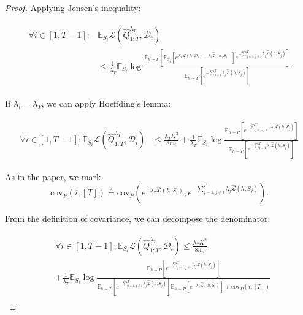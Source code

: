 \documentclass{article}
\theoremstyle{plain}
\theoremstyle{definition}
\theoremstyle{remark}
\begin{document}
\begin{proof}
Applying Jensen's inequality:

\begin{align*} 
\begin{split}
\forall i\in[1,T-1]:
&\mathbb{E}_{S_i}\mathcal{L}(\hat{Q}^{\lambda_T}_{1:T}, \mathcal{D}_i) \\&\leq \frac{1}{\lambda_T}\mathbb{E}_{S_i}\log\frac{\mathbb{E}_{h\sim P}\left [\mathbb{E}_{S_i}\left [e^{\lambda_T\mathcal{L}(h,\mathcal{D}_i)-\lambda_i\hat{\mathcal{L}}(h,S_i)} \right ]e^{-\sum_{j=1,j\neq i}^{T}\lambda_j\hat{\mathcal{L}}(h,S_j)} \right ]}{\mathbb{E}_{h\sim P}\left [e^{-\sum_{j=1}^{T}\lambda_j\hat{\mathcal{L}}(h,S_j)} \right ]}
\end{split}
\end{align*}

If $\lambda_i=\lambda_T$, we can apply Hoeffding's lemma:

\begin{align*} 
\begin{split}
\forall i\in[1,T-1]:
\mathbb{E}_{S_i}\mathcal{L}(\hat{Q}^{\lambda_T}_{1:T}, \mathcal{D}_i) &\leq \frac{\lambda_T K^2}{8m_i}+\frac{1}{\lambda_T}\mathbb{E}_{S_i}\log\frac{\mathbb{E}_{h\sim P}\left [e^{-\sum_{j=1,j\neq i}^{T}\lambda_j\hat{\mathcal{L}}(h,S_j)} \right ]}{\mathbb{E}_{h\sim P}\left [e^{-\sum_{j=1}^{T}\lambda_j\hat{\mathcal{L}}(h,S_j)} \right ]}
\end{split}
\end{align*}

As in the paper, we mark 
$$\mathrm{cov}_{P}(i, [T])\triangleq\mathrm{cov}_{P}(e^{-\lambda_T\hat{\mathcal{L}}(h,S_i)}, e^{-\sum_{j=1,j\neq i}^{T}\lambda_j\hat{\mathcal{L}}(h,S_j)}).$$

From the definition of covariance, we can decompose the denominator:

\begin{align} \label{eq-oracle-forget-extend}
\begin{split}
&\forall i\in[1,T-1]:
\mathbb{E}_{S_i}\mathcal{L}(\hat{Q}^{\lambda_T}_{1:T}, \mathcal{D}_i) \leq \frac{\lambda_T K^2}{8m_i}\\&+\frac{1}{\lambda_T}\mathbb{E}_{S_i}\log\frac{\mathbb{E}_{h\sim P}\left [e^{-\sum_{j=1,j\neq i}^{T}\lambda_j\hat{\mathcal{L}}(h,S_j)} \right ]}{\mathbb{E}_{h\sim P}\left [e^{-\sum_{j=1,j\neq i}^{T}\lambda_j\hat{\mathcal{L}}(h,S_j)} \right ]\mathbb{E}_{h\sim P}\left [e^{-\lambda_T\hat{\mathcal{L}}(h,S_i)} \right ]+\mathrm{cov}_{P}(i, [T])}
\end{split}
\end{align}


\end{proof}
\end{document}
